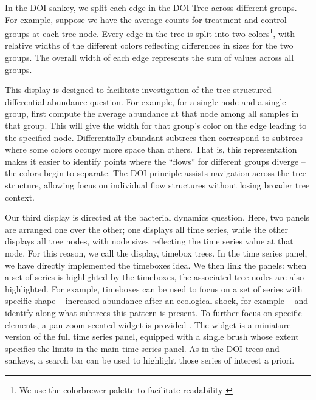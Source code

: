 \documentclass[12pt]{article}
\begin{document}
In the DOI sankey, we split each edge in the DOI Tree across different
groups. For example, suppose we have the average counts for treatment
and control groups at each tree node. Every edge in the tree is split
into two colors\footnote{We use the colorbrewer palette to facilitate
  readability \citep{brewer2003colorbrewer}}, with relative
widths of the different colors reflecting differences in sizes for the
two groups. The overall width of each edge represents the sum of values
across all groups.

This display is designed to facilitate investigation of the tree
structured differential abundance question. For example, for a single
node and a single group, first compute the average abundance at that
node among all samples in that group. This will give the width for that
group's color on the edge leading to the specified node. Differentially
abundant subtrees then correspond to subtrees where some colors occupy
more space than others. That is, this representation makes it easier to
identify points where the ``flows'' for different groups diverge -- the
colors begin to separate. The DOI principle assists navigation across
the tree structure, allowing focus on individual flow structures without
losing broader tree context.

Our third display is directed at the bacterial dynamics question. Here,
two panels are arranged one over the other; one displays all time
series, while the other displays all tree nodes, with node sizes
reflecting the time series value at that node. For this reason, we call
the display, timebox trees. In the time series panel, we have directly
implemented the timeboxes idea. We then link the panels: when a set of
series is highlighted by the timeboxes, the associated tree nodes are
also highlighted. For example, timeboxes can be used to focus on a set
of series with specific shape -- increased abundance after an ecological
shock, for example -- and identify along what subtrees this pattern is
present. To further focus on specific elements, a pan-zoom scented
widget is provided \citep{willett2007scented}. The widget is a miniature version
of the full time series panel, equipped with a single brush whose extent
specifies the limits in the main time series panel. As in the DOI trees and
sankeys, a search bar can be used to highlight those series of interest a
priori.
\end{document}
